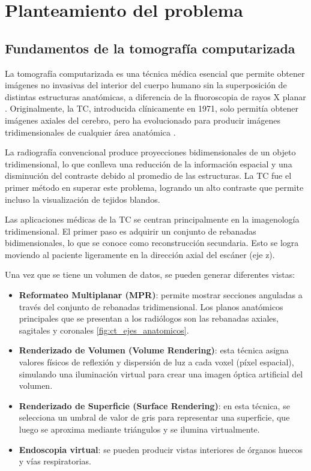 
\chapter{Planteamiento del problema} \label{chap:planteamiento-problema}

\section{Fundamentos de la tomografía computarizada}
La tomografía computarizada es una técnica médica esencial que permite obtener imágenes no invasivas del interior del cuerpo humano sin la superposición de distintas estructuras anatómicas, a diferencia de la fluoroscopia de rayos X planar \parencite{buzug2011computed}. Originalmente, la TC, introducida clínicamente en 1971, solo permitía obtener imágenes axiales del cerebro, pero ha evolucionado para producir imágenes tridimensionales de cualquier área anatómica \parencite{calzado2010tomografia}.

La radiografía convencional produce proyecciones bidimensionales de un objeto tridimensional, lo que conlleva una reducción de la información espacial y una disminución del contraste debido al promedio de las estructuras. La TC fue el primer método en superar este problema, logrando un alto contraste que permite incluso la visualización de tejidos blandos.

Las aplicaciones médicas de la TC se centran principalmente en la imagenología tridimensional. El primer paso es adquirir un conjunto de rebanadas bidimensionales, lo que se conoce como reconstrucción secundaria. Esto se logra moviendo al paciente ligeramente en la dirección axial del escáner (eje z). 

Una vez que se tiene un volumen de datos, se pueden generar diferentes vistas:

\begin{itemize}
    \item \textbf{Reformateo Multiplanar (MPR)}: permite mostrar secciones anguladas a través del conjunto de rebanadas tridimensional. Los planos anatómicos principales que se presentan a los radiólogos son las rebanadas axiales, sagitales y coronales \ref{fig:ct_ejes_anatomicos}. 
    \item \textbf{Renderizado de Volumen (Volume Rendering)}: esta técnica asigna valores físicos de reflexión y dispersión de luz a cada voxel (píxel espacial), simulando una iluminación virtual para crear una imagen óptica artificial del volumen.
    \item \textbf{Renderizado de Superficie (Surface Rendering)}: en esta técnica, se selecciona un umbral de valor de gris para representar una superficie, que luego se aproxima mediante triángulos y se ilumina virtualmente.
    \item \textbf{Endoscopia virtual}: se pueden producir vistas interiores de órganos huecos y vías respiratorias.
\end{itemize}

